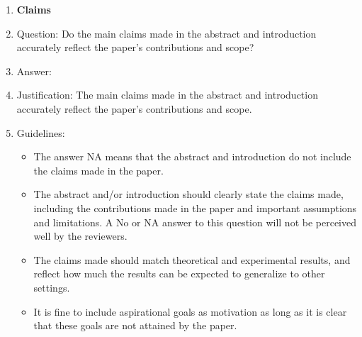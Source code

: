 \documentclass{article}
\begin{document}
\fi
{}
\begin{enumerate}

\item {\bf Claims}
    \item[] Question: Do the main claims made in the abstract and introduction accurately reflect the paper's contributions and scope?
    \item[] Answer: \answerYes{} %
    \item[] Justification: The main claims made in the abstract and introduction accurately reflect the paper’s contributions and scope.
    \item[] Guidelines:
    \begin{itemize}
        \item The answer NA means that the abstract and introduction do not include the claims made in the paper.
        \item The abstract and/or introduction should clearly state the claims made, including the contributions made in the paper and important assumptions and limitations. A No or NA answer to this question will not be perceived well by the reviewers. 
        \item The claims made should match theoretical and experimental results, and reflect how much the results can be expected to generalize to other settings. 
        \item It is fine to include aspirational goals as motivation as long as it is clear that these goals are not attained by the paper. 
    \end{itemize}


\end{enumerate}
\end{document}
